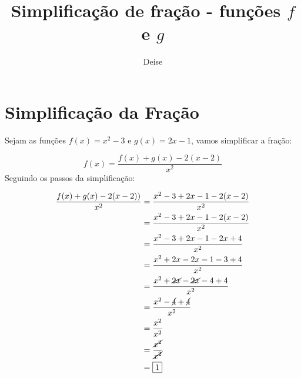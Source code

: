 \documentclass[a4paper, portuguese, 12pt]{article} %
\begin{document}
\title{Simplificação de fração - funções $f$ e $g$} %
\author{Deise} %

\maketitle %

\section*{Simplificação da Fração} %
Sejam as funções $f(x) = x^{2} - 3$ e $g(x) = 2x - 1$, vamos simplificar a fração:

\[
f(x) = \frac{f(x) + g(x) - 2(x - 2)}{x^{2}}
\]
Seguindo os passos da simplificação:

\begin{align*}
    \frac{f(x) + g(x) - 2(x - 2))}{x^{2}} &= \frac{x^{2} - 3 + 2x - 1 - 2(x - 2)}{x^{2}} \\
    &= \frac{x^{2} - 3 + 2x - 1 - 2(x - 2)}{x^{2}} \\
    &= \frac{x^{2} - 3 + 2x - 1 - 2x + 4}{x^{2}} \\
    &= \frac{x^{2} + 2x - 2x - 1 - 3 + 4}{x^{2}} \\
    &= \frac{x^{2} + \cancel{2x} - \cancel{2x} - 4 + 4}{x^{2}} \\
    &= \frac{x^{2} - \cancel{4} + \cancel{4}}{x^{2}} \\
    &= \frac{x^{2}}{x^{2}} \\
    &= \frac{\cancel{x^{2}}}{\cancel{x^{2}}} \\
    &= \boxed{1}
\end{align*}
\end{document}
